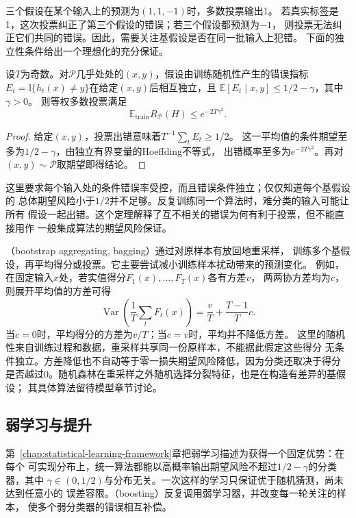 三个假设在某个输入上的预测为$(1,1,-1)$时，多数投票输出1。
若真实标签是1，这次投票纠正了第三个假设的错误；若三个假设都预测为$-1$，
则投票无法纠正它们共同的错误。因此，需要关注基假设是否在同一批输入上犯错。
下面的独立性条件给出一个理想化的充分保证。

\begin{theorem}[独立错误下的多数投票]
\label{thm:independent-majority-vote}
设$T$为奇数。对$\mathcal P$几乎处处的$(x,y)$，假设由训练随机性产生的错误指标
$E_t=\mathbb I\{h_t(x)\neq y\}$在给定$(x,y)$后相互独立，且
$\mathbb E[E_t\mid x,y]\leq1/2-\gamma$，其中$\gamma>0$。
则等权多数投票满足
\[
 \mathbb E_{\mathrm{train}}R_{\mathcal P}(H)\leq e^{-2T\gamma^2}.
\]
\end{theorem}

\begin{proof}
给定$(x,y)$，投票出错意味着$T^{-1}\sum_tE_t\geq1/2$。
这一平均值的条件期望至多为$1/2-\gamma$，由独立有界变量的Hoeffding不等式，
出错概率至多为$e^{-2T\gamma^2}$。再对$(x,y)\sim\mathcal P$取期望即得结论。
\end{proof}

这里要求每个输入处的条件错误率受控，而且错误条件独立；仅仅知道每个基假设的
总体期望风险小于$1/2$并不足够。反复训练同一个算法时，难分类的输入可能让所有
假设一起出错。这个定理解释了互不相关的错误为何有利于投票，但不能直接用作
一般集成算法的期望风险保证。

（bootstrap aggregating, bagging）通过对原样本有放回地重采样，
训练多个基假设，再平均得分或投票。它主要尝试减小训练样本扰动带来的预测变化。
例如，在固定输入$x$处，若实值得分$F_1(x),\ldots,F_T(x)$各有方差$v$，
两两协方差均为$c$，则展开平均值的方差可得
\[
 \operatorname{Var}\!\left(\frac1T\sum_tF_t(x)\right)
 =\frac{v}{T}+\frac{T-1}{T}c.
\]
当$c=0$时，平均得分的方差为$v/T$；当$c=v$时，平均并不降低方差。
这里的随机性来自训练过程和数据，重采样共享同一份原样本，不能据此假定这些得分
无条件独立。方差降低也不自动等于零一损失期望风险降低，因为分类还取决于得分
是否越过0。随机森林在重采样之外随机选择分裂特征，也是在构造有差异的基假设；
其具体算法留待模型章节讨论。

\subsection{弱学习与提升}

第~\ref{chap:statistical-learning-framework}章把弱学习描述为获得一个固定优势：在每个
可实现分布上，统一算法都能以高概率输出期望风险不超过$1/2-\gamma$的分类器，其中
$\gamma\in(0,1/2)$与分布无关。一次这样的学习只保证优于随机猜测，尚未达到任意小的
误差容限。（boosting）反复调用弱学习器，并改变每一轮关注的样本，
使多个弱分类器的错误相互补偿。

